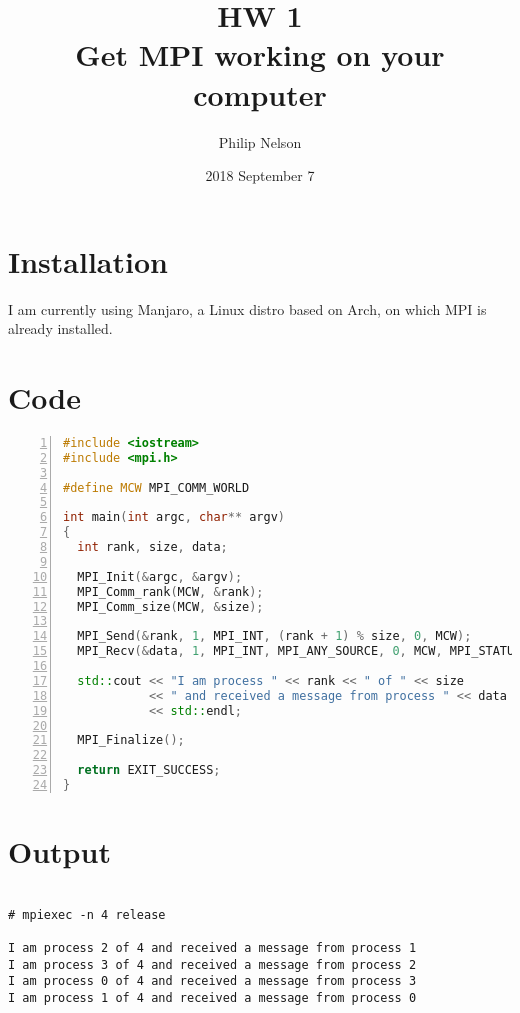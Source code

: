 \documentclass{article}
\title{HW 1 \\ Get MPI working on your computer}
\author{Philip Nelson}
\date{2018 September 7}
\begin{document}
\maketitle

\section*{Installation}

I am currently using Manjaro, a Linux distro based on Arch, on which MPI is already installed.

\section*{Code}

\begin{lstlisting}[showstringspaces=false, language=c++, numbers=left]
#include <iostream>
#include <mpi.h>

#define MCW MPI_COMM_WORLD

int main(int argc, char** argv)
{
  int rank, size, data;

  MPI_Init(&argc, &argv);
  MPI_Comm_rank(MCW, &rank);
  MPI_Comm_size(MCW, &size);

  MPI_Send(&rank, 1, MPI_INT, (rank + 1) % size, 0, MCW);
  MPI_Recv(&data, 1, MPI_INT, MPI_ANY_SOURCE, 0, MCW, MPI_STATUS_IGNORE);

  std::cout << "I am process " << rank << " of " << size
            << " and received a message from process " << data
            << std::endl;

  MPI_Finalize();

  return EXIT_SUCCESS;
}
\end{lstlisting}

\section*{Output}

\begin{lstlisting}[showstringspaces=false]

# mpiexec -n 4 release

I am process 2 of 4 and received a message from process 1
I am process 3 of 4 and received a message from process 2
I am process 0 of 4 and received a message from process 3
I am process 1 of 4 and received a message from process 0

\end{lstlisting}
\end{document}
